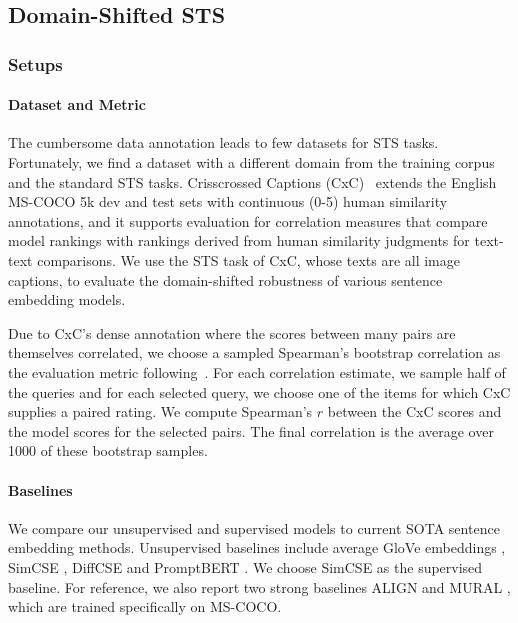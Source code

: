 \documentclass[11pt]{article}
\begin{document}
\subsection{Domain-Shifted STS}
\label{sec: transfer sts}
\subsubsection{Setups}
\paragraph{Dataset and Metric}
The cumbersome data annotation leads to few datasets for STS tasks. Fortunately, we find a dataset with a different domain from the training corpus and the standard STS tasks. 
Crisscrossed Captions (CxC)~\cite{parekh-etal-2021-cococxc} extends the English MS-COCO \cite{mscoco} 5k dev and test sets with continuous (0-5) human similarity annotations, and it supports evaluation for correlation measures that compare model rankings with rankings derived from human similarity judgments for text-text comparisons.
We use the STS task of CxC, whose texts are all image captions, to evaluate the domain-shifted robustness of various sentence embedding models.

Due to CxC’s dense annotation where the scores between many pairs are themselves correlated, we choose a sampled Spearman's bootstrap correlation as the evaluation metric following~\cite{parekh-etal-2021-cococxc}. For each correlation estimate, we sample half of the queries and for each selected query, we choose one of the items for which CxC supplies a paired rating. We compute Spearman’s $r$ between the CxC scores and the model scores for the selected pairs. The final correlation is the average over 1000 of these bootstrap samples.

\paragraph{Baselines}
We compare our unsupervised and supervised models to current SOTA sentence embedding methods. Unsupervised baselines include average GloVe embeddings \cite{glove}, SimCSE \cite{gao2021simcse}, DiffCSE \cite{chuang2022diffcse} and PromptBERT \cite{2022promptbert}. We choose SimCSE \cite{gao2021simcse} as the supervised baseline.
For reference, we also report two strong baselines ALIGN \cite{jia2021align} and MURAL \cite{jain-etal-2021-mural-multimodal}, which are trained specifically on MS-COCO.
\end{document}
